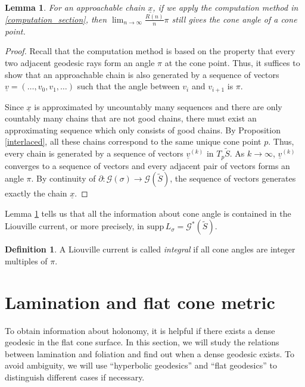 \documentclass[reqno]{amsart}
\theoremstyle{plain}
\newtheorem{lemma}[thm]{Lemma}
\theoremstyle{definition}
\newtheorem{definition}[thm]{Definition}
\theoremstyle{remark}
\theoremstyle{definition}
\newcommand{\?}{\textcolor{red}{?}}
\newcommand{\Gsigma}{\mathcal{G}(\sigma) }
\newcommand{\Gs}{\mathcal{G}(\tilde{S}) }
\newcommand{\Gss}{\mathcal{G}^*(\tilde{S}) }
\newcommand{\supp}{\mathrm{supp}\, L_\sigma}
\begin{document}
\begin{lemma}\label{approachable}
For an approachable chain $\underline{x}$, if we apply the computation method in \textsection\ref{computation_section}, then $\lim_{n\to\infty}\frac{R(n)}{n}\pi$ still gives the cone angle of a cone point.
\end{lemma}
\begin{proof}
Recall that the computation method is based on the property that every two adjacent geodesic rays form an angle $\pi$ at the cone point. Thus, it suffices to show that an approachable chain is also generated by a sequence of vectors $\underline{v}=(\ldots,v_0,v_1,\ldots)$ such that the angle between $v_i$ and $v_{i+1}$ is $\pi$.

Since $\underline{x}$ is approximated by uncountably many sequences and there are only countably many chains that are not good chains, there must exist an approximating sequence which only consists of good chains. By Proposition \ref{interlaced}, all these chains correspond to the same unique cone point $p$. Thus, every chain is generated by a sequence of vectors $\underline{v}^{(k)}$ in $T_p\tilde{S}$. As $k\to\infty$, $\underline{v}^{(k)}$ converges to a sequence of vectors and every adjacent pair of vectors forms an angle $\pi$. By continuity of $\partial:\Gsigma\to\Gs$, the sequence of vectors generates exactly the chain $\underline{x}$.
\end{proof}


Lemma \ref{approachable} tells us that all the information about cone angle is contained in the Liouville current, or more precisely, in $\supp=\Gss$.

\begin{definition}\label{def_integral}
A Liouville current is called \textit{integral} if all cone angles are integer multiples of $\pi$.
\end{definition}


\section{Lamination and flat cone metric}

To obtain information about holonomy, it is helpful if there exists a dense geodesic in the flat cone surface. In this section, we will study the relations between lamination and foliation and find out when a dense geodesic exists. To avoid ambiguity, we will use ``hyperbolic geodesics'' and ``flat geodesics'' to distinguish different cases if necessary.
\end{document}
